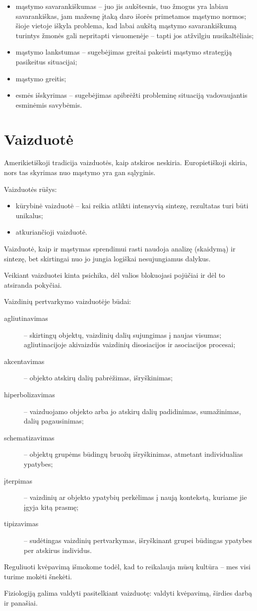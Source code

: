 \begin{itemize}
  \item mąstymo savarankiškumas – juo jis aukštesnis, tuo žmogus yra
    labiau savarankiškas, jam mažesnę įtaką daro išorės primetamos
    mąstymo normos; šioje vietoje iškyla problema, kad labai aukštą
    mąstymo savarankiškumą turintys žmonės gali nepritapti visuomenėje
    – tapti jos atžvilgiu nusikaltėliais;
  \item mąstymo lankstumas – sugebėjimas greitai pakeisti mąstymo
    strategiją pasikeitus situacijai;
  \item mąstymo greitis;
  \item esmės išskyrimas – sugebėjimas apibrėžti probleminę situaciją 
    vadovaujantis esminėmis savybėmis.
\end{itemize}

\section{Vaizduotė}

Amerikietiškoji tradicija vaizduotės, kaip atskiros neskiria. Europietiškoji
skiria, nors tas skyrimas nuo mąstymo yra gan sąlyginis.

Vaizduotės rūšys:

\begin{itemize}
  \item kūrybinė vaizduotė – kai reikia atlikti intensyvią sintezę, 
    rezultatas turi būti unikalus;
  \item atkuriančioji vaizduotė. %
\end{itemize}

Vaizduotė, kaip ir mąstymas sprendimui rasti naudoja analizę (skaidymą) ir
sintezę, bet skirtingai nuo jo jungia logiškai nesujungiamus dalykus.

Veikiant vaizduotei kinta psichika, dėl valios blokuojasi pojūčiai ir dėl
to atsiranda pokyčiai. %

Vaizdinių pertvarkymo vaizduotėje būdai:

\begin{description}
  \item[agliutinavimas] – skirtingų objektų, vaizdinių dalių sujungimas
    į naujas visumas; agliutinacijoje akivaizdūs vaizdinių disosiacijos
    ir asociacijos procesai;
  \item[akcentavimas] – objekto atskirų dalių pabrėžimas, išryškinimas;
  \item[hiperbolizavimas] – vaizduojamo objekto arba jo atskirų dalių
    padidinimas, sumažinimas, dalių pagausinimas;
  \item[schematizavimas] – objektų grupėms būdingų bruožų išryškinimas,
    atmetant individualias ypatybes;
  \item[įterpimas] – vaizdinių ar objekto ypatybių perkėlimas į naują 
    kontekstą, kuriame jie įgyja kitą prasmę;
  \item[tipizavimas] – sudėtingas vaizdinių pertvarkymas, išryškinant
    grupei būdingas ypatybes per atskirus individus.
\end{description}

Reguliuoti kvėpavimą išmokome todėl, kad to reikalauja mūsų kultūra – mes
visi turime mokėti šnekėti.

Fiziologiją galima valdyti pasitelkiant vaizduotę: valdyti kvėpavimą, 
širdies darbą ir panašiai.
